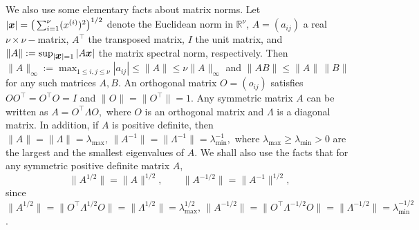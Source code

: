 \documentclass[10pt]{article}
\def\R{\mathbb{R}}
\newcommand{\mbf}[1]{\mbox{\boldmath $#1$}}
\begin{document}
We also use some elementary facts about matrix norms. Let $|{\mbf x}| = \big(\sum_{i=1}^\nu (x^{(i)})^2 \big)^{1/2} $ denote the Euclidean norm
in $\R^\nu$,
$A = (a_{ij}) $  a real $\nu\times \nu-$matrix, $A^\intercal $ the transposed matrix,
$I$ the unit matrix,
and
$\|A \| := \sup_{|{\mbf x}| =1} |A {\mbf x}|$  the matrix spectral norm, respectively.
 Then $\|A\|_{\infty} :=   \max_{1\le i,j\le \nu} |a_{ij}| \le \|A\| \le \nu \|A\|_{\infty}$ and
  $\|A B \| \le \|A \| \,\|B \|$ for any such matrices
$A, B$. An orthogonal matrix  $O = (o_{ij}) $ satisfies $O O^\intercal =  O^\intercal O = I $ and $\| O\| = \| O^\intercal\| =  1.$
Any symmetric matrix $A$ can be written as $A = O^\intercal \Lambda O,$ where $O $ is an orthogonal matrix and
$\Lambda $ is a diagonal matrix. In addition, if $A$ is positive definite, then $\| A\| = \| \Lambda \| =
\lambda_{\max}, \,
\| A^{-1} \| = \| \Lambda^{-1} \| = \lambda^{-1}_{\min}, $ where $\lambda_{\max} \ge \lambda_{\min} >0$ are the largest
and the smallest eigenvalues of $A$. We shall also  use the facts that for
any symmetric positive definite matrix $A$,
\begin{equation}\label{matrixroot}
\|A^{1/2}\|  = \| A \|^{1/2}, \qquad   \|A^{-1/2}\|  = \| A^{-1} \|^{1/2},
\end{equation}
since $\|A^{1/2}\| = \|O^\intercal \Lambda^{1/2} O\|
= \| \Lambda^{1/2} \| =
\lambda^{1/2}_{\max}, \,  \|A^{-1/2}\| = \|O^\intercal \Lambda^{-1/2} O\|
= \| \Lambda^{-1/2} \| =
\lambda^{-1/2}_{\min}$.



\smallskip
\end{document}

